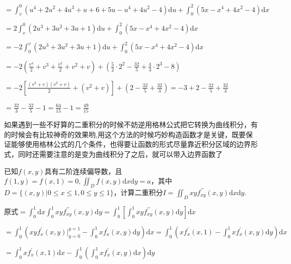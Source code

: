 \begin{xiti}
\begin{solution}
		$=\int_{v}^{0}\left(u^{4}+2 u^{2}+4 u^{3}+u+6+5 u-u^{4}+4 u^{2}-4\right) \mathrm{d}u+\int_{0}^{2}\left(5 x-x^{4}+4 x^{2}-4\right) \mathrm{d}x$
		
		$=2 \int_{v}^{0}\left(2 u^{3}+3 u^{2}+3 u+1\right) \mathrm{d}u+\int_{0}^{2}\left(5 x-x^{4}+4 x^{2}-4\right) \mathrm{d}x$
		
		$=-2 \int_{0}^{v}\left(2 u^{3}+3 u^{2}+3 u+1\right) \mathrm{d}u+\int_{0}^{2}\left(5 x-x^{4}+4 x^{2}-4\right) \mathrm{d}x$
		
		$=-2\left(\frac{v^{4}}{2}+v^{3}+\frac{v^{2}}{2}+v^{2}+v\right)+\left(\frac{5}{2} \cdot 2^{2}-\frac{32}{5}+\frac{4}{3} \cdot 2^{3}-8\right)$
		
		$=-2\left[\frac{\left(v^{2}+v\right)\left(v^{2}+v\right)}{2}+\left(v^{2}+v\right)\right]+\left(2-\frac{32}{5}+\frac{32}{3}\right)=-3+2-\frac{32}{5}+\frac{32}{3}$
		
		$=\frac{32}{3}-\frac{32}{5}-1=\frac{64}{15}-1=\frac{49}{15}$
		
		\begin{note}
			如果遇到一些不好算的二重积分的时候不妨逆用格林公式把它转换为曲线积分，有的时候会有比较神奇的效果哟,用这个方法的时候巧妙构造函数才是关键，既要保证能够使用格林公式的几个条件，也得要让函数的形式尽量靠近积分区域的边界形式，同时还需要注意的是变为曲线积分了之后，就可以带入边界函数了
		\end{note}
	\end{solution}
	\item 已知$f(x,y)$具有二阶连续偏导数，且$f(1, y)=f(x, 1)=0,  \iint_{D} f(x, y) \mathrm{d} x \mathrm{d} y=a$，其中$D=\{(x, y) | 0 \leqslant x \leqslant 1,0 \leqslant y \leqslant 1\}$，计算二重积分$I=\iint_{D} x y f_{x y}^{\prime \prime}(x, y) \mathrm{d} x \mathrm{d} y$.
	
	\begin{solution}
		原式$=\int_{0}^{1} \mathrm{d}x \int_{0}^{1} x y f_{x y}^{\prime \prime}(x, y) \mathrm{d}y=\int_{0}^{1}\left[\int_{0}^{1} x y f_{x y}^{\prime \prime}(x, y) \mathrm{d}y\right] \mathrm{d}x$
		
		$=\int_{0}^{1}\left(x y f_{x}^{\prime}\left.(x, y)\right|_{y=0} ^{y=1}-\int_{0}^{1} x f_{x}^{\prime}(x, y) \mathrm{d} y\right) \mathrm{d}x=\int_{0}^{1}\left(x f_{x}^{\prime}(x, 1)-\int_{0}^{1} x f_{x}^{\prime}(x, y) \mathrm{d}y\right) \mathrm{d}x$
		
		$=\int_{0}^{1} x f_{x}^{\prime}(x, 1) \mathrm{d}x-\int_{0}^{1}\left(\int_{0}^{1} x f_{x}^{\prime}(x, y) \mathrm{d}x\right) \mathrm{d}y$
		

\end{solution}
\end{xiti}
